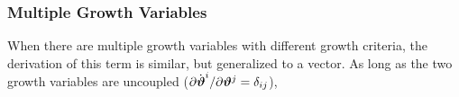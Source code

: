 \documentclass[10pt,letterpaper,oneside]{report}
\newcommand{\ten}[1]{\mbox{\boldmath $#1$}{}}
\newcommand{\tens}[1]{\mbox{\boldmath{\scriptsize{$#1$}}}{}}
\begin{document}
\subsubsection{Multiple Growth Variables}
When there are multiple growth variables with different growth criteria, the derivation of this term is similar, but generalized to a vector.  
As long as the two growth variables are uncoupled ($\partial \dot{\ten{\vartheta}}^i / \partial \ten{\vartheta}^j = \delta_{ij}$),
\end{document}
